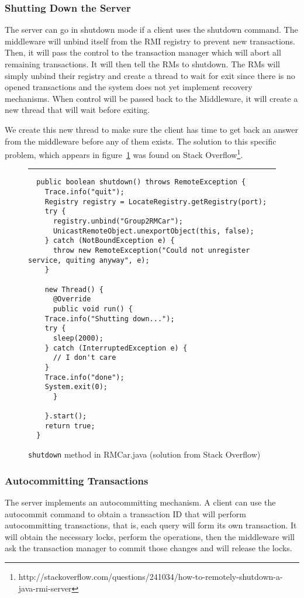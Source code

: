 \documentclass[12pt]{article}
\theoremstyle{plain}%
\theoremstyle{definition}
\theoremstyle{remark}
\newcommand{\java}[1]{{\lstinline!#1!}}
\newenvironment{figureone}[1]{%
  \def\deffigurecaption{#1}%
  \begin{figure}[htbp]%
  \begin{center}%
  \begin{minipage}{\columnwidth}%
  \hrule \vspace*{2ex}%
}{%
  \end{minipage}%
  \end{center}%
  \caption{\deffigurecaption}%
  \end{figure}%
}
\begin{document}
\subsubsection*{Shutting Down the Server}

The server can go in shutdown mode if a client uses the shutdown command. The middleware will unbind itself from the RMI registry to prevent new transactions. Then, it will pass the control to the transaction manager which will abort all remaining transactions. It will then tell the RMs to shutdown. The RMs will simply unbind their registry and create a thread to wait for exit since there is no opened transactions and the system does not yet implement recovery mechanisms. When control will be passed back to the Middleware, it will create a new thread that will wait before exiting.

We create this new thread to make sure the client has time to get back an answer from the middleware before any of them exists. The solution to this specific problem, which appears in figure~\ref{fig:shutdown} was found on Stack Overflow\footnote{http://stackoverflow.com/questions/241034/how-to-remotely-shutdown-a-java-rmi-server}.

\begin{figureone}{\java{shutdown} method in RMCar.java (solution from Stack Overflow) \label{fig:shutdown}}
\begin{lstlisting}
  public boolean shutdown() throws RemoteException {
    Trace.info("quit");
    Registry registry = LocateRegistry.getRegistry(port);
    try {
      registry.unbind("Group2RMCar");
      UnicastRemoteObject.unexportObject(this, false);
    } catch (NotBoundException e) {
      throw new RemoteException("Could not unregister service, quiting anyway", e);
    }

    new Thread() {
      @Override
      public void run() {
	Trace.info("Shutting down...");
	try {
	  sleep(2000);
	} catch (InterruptedException e) {
	  // I don't care
	}
	Trace.info("done");
	System.exit(0);
      }

    }.start();
    return true;
  }
\end{lstlisting}
\end{figureone}

\subsubsection*{Autocommitting Transactions}

The server implements an autocommitting mechanism. A client can use the autocommit command to obtain a transaction ID that will perform autocommitting transactions, that is, each query will form its own transaction. It will obtain the necessary locks, perform the operations, then the middleware will ask the transaction manager to commit those changes and will release the locks. 
\end{document}
